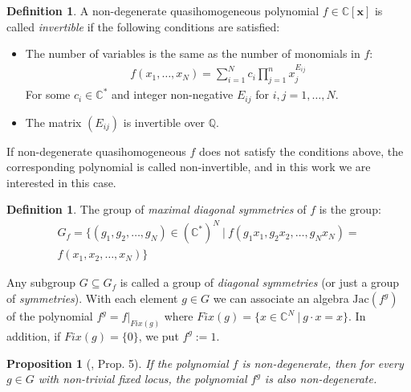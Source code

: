 \documentclass[reqno,12pt]{amsart}
\numberwithin{equation}{section}
\theoremstyle{plain}
\newtheorem{proposition}[theorem]{Proposition}
\theoremstyle{definition}
\newtheorem{definition}[theorem]{Definition}
\newcommand{\hess}{\mathrm{hess}}
\begin{document}


\begin{definition}
A non-degenerate quasihomogeneous polynomial $f\in\mathbb{C}[\mathbf{x}]$ is called \emph{invertible} if the following conditions are satisfied:
\begin{itemize}
\item 
The number of variables is the same as the number of monomials in $f$: 
\begin{align*}
f(x_1,\dots ,x_N)=\sum_{i=1}^N c_i\prod_{j=1}^n x_j^{E_{ij}}
\end{align*}
For some $c_i\in\mathbb{C}^\ast$ and integer non-negative 
$E_{ij}$ for $i,j=1,\dots, N$.
\item
The matrix $(E_{ij})$ is invertible over $\mathbb{Q}$.
\end{itemize}
\end{definition}
If non-degenerate quasihomogeneous $f$ does not satisfy the conditions above, the corresponding polynomial is called non-invertible, and in this work we are interested in this case.
\begin{definition}
The group of \emph{maximal diagonal symmetries} of $f$ is the group:
\begin{align*}
    G_f = \{ (g_1, g_2, \dots, g_N) \in (\mathbb{C}^*)^N \:|\: f(g_1x_1, g_2x_2, \dots, g_Nx_N ) = \\ f(x_1, x_2, \dots, x_N) \}
\end{align*}
\end{definition}
Any subgroup $G\subseteq G_f$ is called a group of \emph{diagonal symmetries} (or just a group of \emph{symmetries}). With each element $g\in G$ we can associate an algebra $\mathrm{Jac}(f^g)$ of the polynomial $f^g = f|_{Fix(g)}$ where $Fix(g) = \{x\in\mathbb{C}^N\:|\:g\cdot x= x \}$. In addition, if $Fix(g) = \{0\}$, we put $f^g := 1$.

\begin{proposition}[\cite{ET1}, Prop. 5]
    If the polynomial $f$ is non-degenerate, then for every $g\in G$ with non-trivial fixed locus, the polynomial $f^g$ is also non-degenerate.
\end{proposition}
\end{document}
